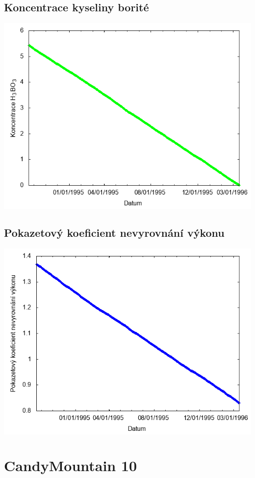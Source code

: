 \documentclass[a4paper,twoside,11pt]{article}
\begin{document}
\subsection*{Koncentrace kyseliny borité}
\begin{center}
\includegraphics[width=.8\textwidth]{graphs/CandyMountain_09_bc.png}
\end{center}

\subsection*{Pokazetový koeficient nevyrovnání výkonu}
\begin{center}
\includegraphics[width=.8\textwidth]{graphs/CandyMountain_09_fha.png}
\end{center}

\newpage
\section*{CandyMountain 10}
\end{document}
